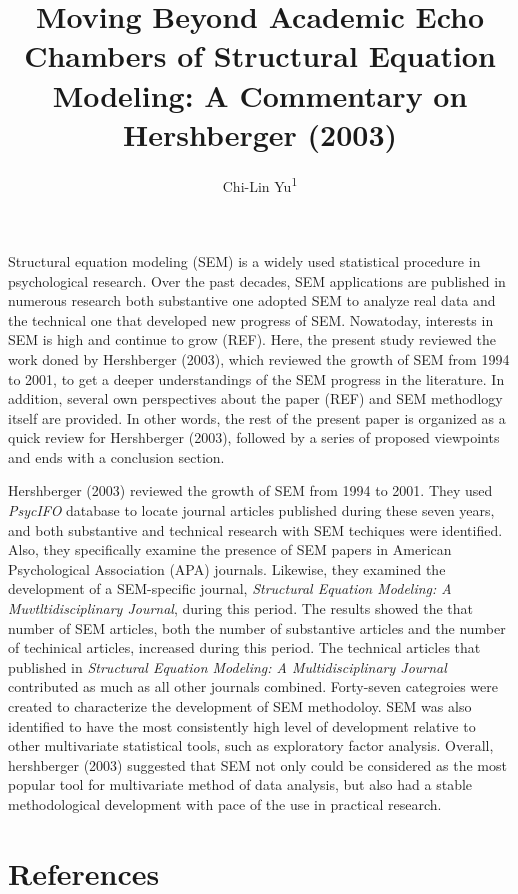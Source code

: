 \documentclass[jou]{apa6}
\title{Moving Beyond Academic Echo Chambers of Structural Equation Modeling: A
Commentary on Hershberger (2003)}
\author{Chi-Lin Yu\textsuperscript{1}}
\affiliation{
    \vspace{0.5cm}
          \textsuperscript{1} Department of Psychology, National Taiwan University  }
\theoremstyle{definition}
\theoremstyle{definition}
\theoremstyle{definition}
\theoremstyle{remark}
\begin{document}
\maketitle

\setcounter{secnumdepth}{0}



Structural equation modeling (SEM) is a widely used statistical
procedure in psychological research. Over the past decades, SEM
applications are published in numerous research both substantive one
adopted SEM to analyze real data and the technical one that developed
new progress of SEM. Nowatoday, interests in SEM is high and continue to
grow (REF). Here, the present study reviewed the work doned by
Hershberger (2003), which reviewed the growth of SEM from 1994 to 2001,
to get a deeper understandings of the SEM progress in the literature. In
addition, several own perspectives about the paper (REF) and SEM
methodlogy itself are provided. In other words, the rest of the present
paper is organized as a quick review for Hershberger (2003), followed by
a series of proposed viewpoints and ends with a conclusion section.

Hershberger (2003) reviewed the growth of SEM from 1994 to 2001. They
used \emph{PsycIFO} database to locate journal articles published during
these seven years, and both substantive and technical research with SEM
techiques were identified. Also, they specifically examine the presence
of SEM papers in American Psychological Association (APA) journals.
Likewise, they examined the development of a SEM-specific journal,
\emph{Structural Equation Modeling: A Muvtltidisciplinary Journal},
during this period. The results showed the that number of SEM articles,
both the number of substantive articles and the number of techinical
articles, increased during this period. The technical articles that
published in \emph{Structural Equation Modeling: A Multidisciplinary
Journal} contributed as much as all other journals combined. Forty-seven
categroies were created to characterize the development of SEM
methodoloy. SEM was also identified to have the most consistently high
level of development relative to other multivariate statistical tools,
such as exploratory factor analysis. Overall, hershberger (2003)
suggested that SEM not only could be considered as the most popular tool
for multivariate method of data analysis, but also had a stable
methodological development with pace of the use in practical research.

\newpage

\hypertarget{references}{%
\section{References}\label{references}}

\setlength{\parindent}{-0.5in}
\setlength{\leftskip}{0.5in}
\end{document}
